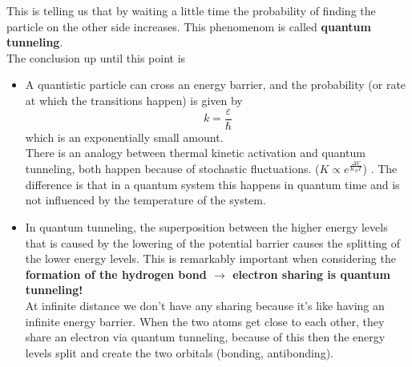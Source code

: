 This is telling us that by waiting a little time the probability of finding the particle on the other side increases. This phenomenom is called \textbf{quantum tunneling}.\\
The conclusion up until this point is
\begin{itemize}
	\item A quantistic particle can cross an energy barrier, and the probability (or 		rate at which the transitions happen) is given by
	\[
	k=\frac{\varepsilon}{\hbar}
	\]
	which is an exponentially small amount.\\
	There is an analogy between thermal kinetic activation and quantum tunneling, both 	happen because of stochastic fluctuations. ($K\propto e^{\frac{\Delta V}{K_B T}}$)		. The difference is that in a quantum system this happens in quantum time and is 		not influenced by the temperature of the system.\\
	\item In quantum tunneling, the superposition between the higher energy levels 			that is caused by the lowering of the potential barrier causes the splitting of 		the lower energy levels. This is remarkably important when considering the 				\textbf{formation of the hydrogen bond $\rightarrow$ electron sharing is quantum 		tunneling!}\\
	At infinite distance we don't have any sharing because it's like having an 				infinite energy barrier. When the two atoms get close to each other, they share an 	electron via quantum tunneling, because of this then the energy levels split and 		create the two orbitals (bonding, antibonding).\\
\end{itemize}

